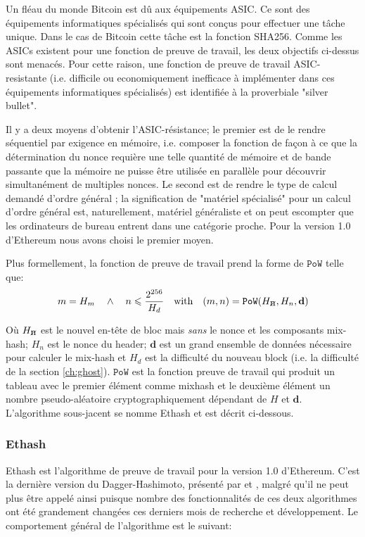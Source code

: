 \documentclass[9pt,oneside]{amsart}
\newcommand{\hcancel}[1]{%
    \tikz[baseline=(tocancel.base)]{
        \node[inner sep=0pt,outer sep=0pt] (tocancel) {#1};
        \draw[black] (tocancel.south west) -- (tocancel.north east);
    }%
}%
\begin{document}
\begin{multicols}{2}
Un fléau du monde Bitcoin est dû aux équipements ASIC. Ce sont des équipements informatiques spécialisés qui sont conçus pour effectuer une tâche unique. Dans le cas de Bitcoin cette tâche est la fonction SHA256. Comme les ASICs existent pour une fonction de preuve de travail, les deux objectifs ci-dessus sont menacés. Pour cette raison, une fonction de preuve de travail ASIC-resistante (i.e. difficile ou economiquement inefficace à implémenter dans ces équipements informatiques spécialisés) est identifiée à la proverbiale "silver bullet".

Il y a deux moyens d'obtenir l'ASIC-résistance; le premier est de le rendre séquentiel par exigence en mémoire, i.e. composer la fonction de façon à ce que la détermination du nonce requière une telle quantité de mémoire et de bande passante que la mémoire ne puisse être utilisée en parallèle pour découvrir simultanément de multiples nonces. Le second est de rendre le type de calcul demandé d'ordre général ; la signification de "matériel spécialisé" pour un calcul d'ordre général est, naturellement, matériel généraliste et on peut escompter que les ordinateurs de bureau entrent dans une catégorie proche. Pour la version 1.0 d'Ethereum nous avons choisi le premier moyen.

Plus formellement, la fonction de preuve de travail prend la forme de $\mathtt{PoW}$ telle que:
\begin{equation}
m = H_m \quad \wedge \quad n \leqslant \frac{2^{256}}{H_d} \quad \text{with} \quad (m, n) = \mathtt{PoW}(H_{\hcancel{n}}, H_n, \mathbf{d})
\end{equation}

Où $H_{\hcancel{n}}$ est le nouvel en-tête de bloc mais \textit{sans} le nonce et les composants mix-hash; $H_n$ est le nonce du header; $\mathbf{d}$ est un grand ensemble de données nécessaire pour calculer le mix-hash et $H_d$ est la difficulté du nouveau block (i.e. la difficulté de la section \ref{ch:ghost}). $\mathtt{PoW}$ est la fonction preuve de travail qui produit un tableau avec le premier élément comme mixhash et le deuxième élément un nombre pseudo-aléatoire cryptographiquement dépendant de $H$ et $\mathbf{d}$. L'algorithme sous-jacent se nomme Ethash et est décrit ci-dessous.

\subsubsection{Ethash}
Ethash est l'algorithme de preuve de travail pour la version 1.0 d'Ethereum. C'est la dernière version du Dagger-Hashimoto, présenté par \cite{dagger} et \cite{hashimoto}, malgré qu'il ne peut plus être appelé ainsi puisque nombre des fonctionnalités de ces deux algorithmes ont été grandement changées ces derniers mois de recherche et développement. Le comportement général de l'algorithme est le suivant: 


\end{multicols}
\end{document}
